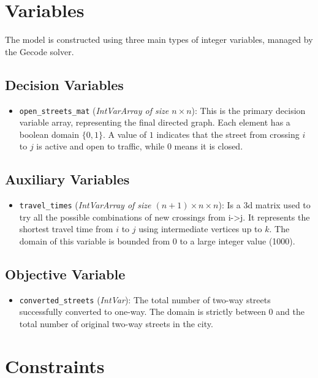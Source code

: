 \section*{Variables}
The model is constructed using three main types of integer variables, managed by the Gecode solver.

\subsection*{Decision Variables}
\begin{itemize}
    \item \texttt{open\_streets\_mat} (\textit{IntVarArray of size $n \times n$}): 
    This is the primary decision variable array, representing the final directed graph. Each element has a boolean domain $\{0, 1\}$. A value of $1$ indicates that the street from crossing $i$ to $j$ is active and open to traffic, while $0$ means it is closed.
\end{itemize}

\subsection*{Auxiliary Variables}
\begin{itemize}
    \item \texttt{travel\_times} (\textit{IntVarArray of size $(n+1) \times n \times n$}): 
    Is a 3d matrix used to try all the possible combinations of new crossings from i->j. It represents the shortest travel time from $i$ to $j$ using intermediate vertices up to $k$. The domain of this variable is bounded from $0$ to a large integer value (1000).
\end{itemize}

\subsection*{Objective Variable}
\begin{itemize}
    \item \texttt{converted\_streets} (\textit{IntVar}): 
    The total number of two-way streets successfully converted to one-way. The domain is strictly between $0$ and the total number of original two-way streets in the city.
\end{itemize}

\section*{Constraints}

